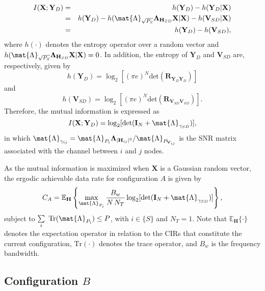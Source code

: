 \begin{eqnarray}
	I(\mathbf{X};\mathbf{Y}_D) & = & h(\mathbf{Y}_D)-h(\mathbf{Y}_D|\mathbf{X})\nonumber\\
	& = & h(\mathbf{Y}_D) - h(\mat{\Lambda}_{\sqrt{P_{S}}} \mathbf{\Lambda}_{\mathbf{H}_{SD}} \mathbf{X} |\mathbf{X}) - h(\mathbf{V}_{SD}|\mathbf{X})\nonumber \\
	& = & h(\mathbf{Y}_{D})-h(\mathbf{V}_{SD}),
\end{eqnarray}
where $ h(\cdot) $ denotes the entropy operator over a random vector and $h(\mat{\Lambda}_{\sqrt{P_{S}}} \mathbf{\Lambda}_{\mathbf{H}_{SD}} \mathbf{X} |\mathbf{X}) = 0$. In addition, the entropy of $\mathbf{Y}_{D}$ and $\mathbf{V}_{SD}$ are, respectively, given by
\begin{equation}
	h(\mathbf{Y}_{D}) = \log_{2}[(\pi e)^{N} \text{det}(\mathbf{R}_{\mathbf{Y}_{D}\mathbf{Y}_{D}})]
\end{equation}
and
\begin{equation}
	h(\mathbf{V}_{SD}) = \log_{2}[(\pi e)^{N} \text{det} (\mathbf{R}_{\mathbf{V}_{SD}\mathbf{V}_{SD}})].
\end{equation}
Therefore, the mutual information is expressed as 
\begin{equation}
	I(\mathbf{X};\mathbf{Y}_D) = \log_{2} [\text{det}(\mathbf{I}_{N}+ \mat{\Lambda}_{\gamma_{SD}})],
\end{equation}
in which $ \mat{\Lambda}_{\gamma_{ij}} = \mat{\Lambda}_{P_{i}} \mathbf{\Lambda}_{|\mathbf{H}_{ij}|^2} / \mat{\Lambda}_{P_{\mathbf{V}_{ij}}} $ is the \ac{SNR} matrix associated with the channel between $i$ and $j$ nodes.

As the mutual information is maximized when $\mathbf{X}$ is a Gaussian random vector, the ergodic achievable data rate for configuration $A$ is given by
\begin{equation}
	C_{A} = \mathbb{E}_{\mathbf{H}}\left\{\max_{\mat{\Lambda}_{P_{i}}} \dfrac{B_{w}}{N \, N_{T}} \log_{2} [\text{det}(\mathbf{I}_{N}+ \mat{\Lambda}_{\gamma_{SD}} )]\right\},
\end{equation}
subject to $ \sum\limits_{i} \ \text{Tr}(\mat{\Lambda}_{P_{i}}) \leq P $, with $i \in \{S\}$ and $ N_T = 1 $. Note that $ \mathbb{E}_{\mathbf{H}}\{\cdot\} $ denotes the expectation operator in relation to the \ac{CIR}s that constitute the current configuration, $\text{Tr}(\cdot)$ denotes the trace operator, and $ B_w $ is the frequency bandwidth.

\subsection{\textbf{Configuration $B$}}\label{subsec:confb}

